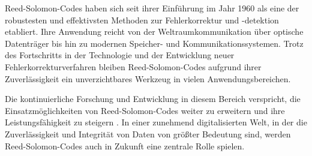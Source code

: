 Reed-Solomon-Codes haben sich seit ihrer Einführung im Jahr 1960 als eine der robustesten und effektivsten Methoden zur Fehlerkorrektur und -detektion etabliert. 
Ihre Anwendung reicht von der Weltraumkommunikation über optische Datenträger bis hin zu modernen Speicher- und Kommunikationssystemen. 
Trotz des Fortschritts in der Technologie und der Entwicklung neuer Fehlerkorrekturverfahren bleiben Reed-Solomon-Codes aufgrund ihrer Zuverlässigkeit ein unverzichtbares Werkzeug in vielen Anwendungsbereichen.

Die kontinuierliche Forschung und Entwicklung in diesem Bereich verspricht, die Einsatzmöglichkeiten von Reed-Solomon-Codes weiter zu erweitern und ihre Leistungsfähigkeit zu steigern \cite{conOptimalTwoDimensionalReed2024, sippelReedSolomonCodes2019}. 
In einer zunehmend digitalisierten Welt, in der die Zuverlässigkeit und Integrität von Daten von größter Bedeutung sind, werden Reed-Solomon-Codes auch in Zukunft eine zentrale Rolle spielen.